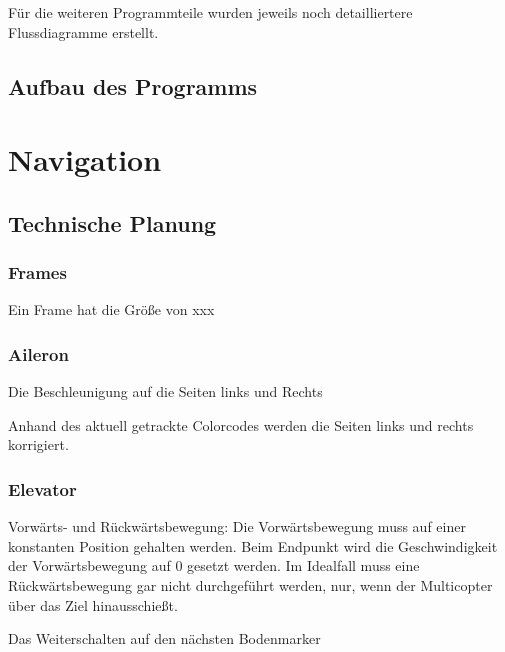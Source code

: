   Für die weiteren Programmteile wurden jeweils noch detailliertere Flussdiagramme erstellt.

  \subsection{Aufbau des Programms}






\section{Navigation}

  \subsection{Technische Planung}
  
    \subsubsection{Frames}


    Ein Frame hat die Größe von xxx

    \subsubsection{Aileron}

    Die Beschleunigung auf die Seiten links und Rechts

    Anhand des aktuell getrackte Colorcodes werden die Seiten links und rechts korrigiert. 



    \subsubsection{Elevator}

    Vorwärts- und Rückwärtsbewegung: Die Vorwärtsbewegung muss auf einer konstanten Position gehalten werden. Beim Endpunkt wird die Geschwindigkeit der Vorwärtsbewegung auf 0 gesetzt werden. Im Idealfall muss eine Rückwärtsbewegung gar nicht durchgeführt werden, nur, wenn der Multicopter über das Ziel hinausschießt.

    Das Weiterschalten auf den nächsten Bodenmarker

